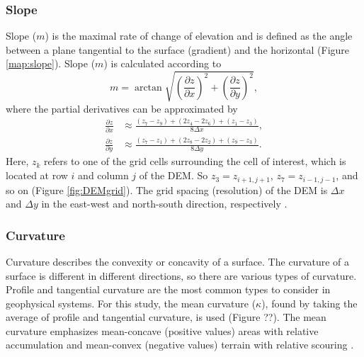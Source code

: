 \documentclass[12pt]{article}
\begin{document}
\subsubsection*{Slope} 

Slope ($m$) is the maximal rate of change of elevation and is defined as the angle between a plane tangential to the surface (gradient) and the horizontal \citep{Olaya2009} (Figure \ref{map:slope}). Slope ($m$) is calculated according to 
\begin{equation}
m = \arctan \sqrt{\left( \frac{\partial z}{\partial x} \right) ^2 + \left( \frac{\partial z}{\partial y} \right) ^2},
\end{equation}
where the partial derivatives can be approximated by \citep{Mitavsova1993, Neteler2008, Hofierka2009}
\begin{align} \label{eq:firstpartial}
\frac{\partial z}{\partial x} &\approx \frac{(z_7-z_9)+(2z_4-2z_6)+(z_1-z_3)}{8  \Delta x},\nonumber \\
\frac{\partial z}{\partial y} &\approx \frac{(z_7-z_1)+(2z_8-2z_2)+(z_9-z_3)}{8  \Delta y}.
\end{align}
Here, $z_k$ refers to one of the grid cells surrounding the cell of interest, which is located at row $i$ and column $j$ of the DEM. So $z_3 = z_{i+1,j+1}$, $z_7 = z_{i-1,j-1}$, and so on (Figure \ref{fig:DEMgrid}). The grid spacing (resolution) of the DEM is $\Delta x$ and $\Delta y$ in the east-west and north-south direction, respectively \citep{Neteler2008}. 


\subsubsection*{Curvature} 

Curvature describes the convexity or concavity of a surface. The curvature of a surface is different in different directions, so there are various types of curvature. Profile and tangential curvature are the most common types to consider in geophysical systems. For this study, the mean curvature ($\kappa$), found by taking the average of profile and tangential curvature, is used (Figure ??). The mean curvature emphasizes mean-concave (positive values) areas with relative accumulation and mean-convex (negative values) terrain with relative scouring \citep{Olaya2009}.
\end{document}
